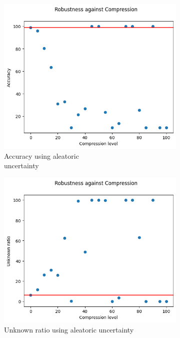 \begin{figure}[H]
	\centering
	\begin{subfigure}{.33\textwidth}
		\centering
		\includegraphics[width=0.9\linewidth]{ImageFiles/EvalBNN/CO/AU/acc}
		\caption{Accuracy using aleatoric \\ uncertainty}
		\label{fig:co_au_acc}
	\end{subfigure}%
	\begin{subfigure}{.33\textwidth}
		\centering
		\includegraphics[width=0.9\linewidth]{ImageFiles/EvalBNN/CO/AU/unkn}
		\caption{Unknown ratio using aleatoric uncertainty}
		\label{fig:co_au_unkn}
	\end{subfigure}%
	\begin{subfigure}{.33\textwidth}

\end{subfigure}
\end{figure}
